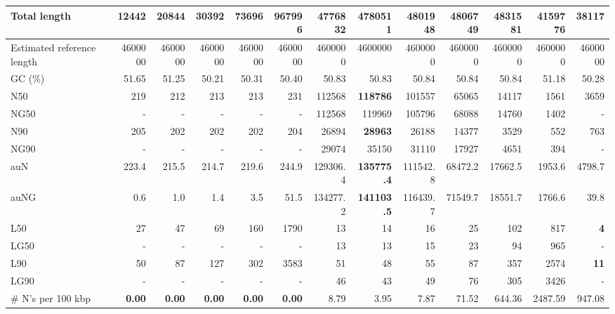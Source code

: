 \documentclass[12pt,a4paper]{article}
\begin{document}
\begin{table}[ht]
\begin{center}
\begin{tabular}{|l*{12}{|r}|}
Total length & 12442 & 20844 & 30392 & 73696 & 967996 & 4776832 & 4780511 & 4801948 & 4806749 & {\bf 4831581} & 4159776 & 38117 \\ \hline
Estimated reference length & 4600000 & 4600000 & 4600000 & 4600000 & 4600000 & 4600000 & 4600000 & 4600000 & 4600000 & 4600000 & 4600000 & 4600000 \\ \hline
GC (\%) & 51.65 & 51.25 & 50.21 & 50.31 & 50.40 & 50.83 & 50.83 & 50.84 & 50.84 & 50.84 & 51.18 & 50.28 \\ \hline
N50 & 219 & 212 & 213 & 213 & 231 & 112568 & {\bf 118786} & 101557 & 65065 & 14117 & 1561 & 3659 \\ \hline
NG50 & - & - & - & - & - & 112568 & 119969 & 105796 & 68088 & 14760 & 1402 & - \\ \hline
N90 & 205 & 202 & 202 & 202 & 204 & 26894 & {\bf 28963} & 26188 & 14377 & 3529 & 552 & 763 \\ \hline
NG90 & - & - & - & - & - & 29074 & 35150 & 31110 & 17927 & 4651 & 394 & - \\ \hline
auN & 223.4 & 215.5 & 214.7 & 219.6 & 244.9 & 129306.4 & {\bf 135775.4} & 111542.8 & 68472.2 & 17662.5 & 1953.6 & 4798.7 \\ \hline
auNG & 0.6 & 1.0 & 1.4 & 3.5 & 51.5 & 134277.2 & {\bf 141103.5} & 116439.7 & 71549.7 & 18551.7 & 1766.6 & 39.8 \\ \hline
L50 & 27 & 47 & 69 & 160 & 1790 & 13 & 14 & 16 & 25 & 102 & 817 & {\bf 4} \\ \hline
LG50 & - & - & - & - & - & 13 & 13 & 15 & 23 & 94 & 965 & - \\ \hline
L90 & 50 & 87 & 127 & 302 & 3583 & 51 & 48 & 55 & 87 & 357 & 2574 & {\bf 11} \\ \hline
LG90 & - & - & - & - & - & 46 & 43 & 49 & 76 & 305 & 3426 & - \\ \hline
\# N's per 100 kbp & {\bf 0.00} & {\bf 0.00} & {\bf 0.00} & {\bf 0.00} & {\bf 0.00} & 8.79 & 3.95 & 7.87 & 71.52 & 644.36 & 2487.59 & 947.08 \\ \hline
\end{tabular}
\end{center}
\end{table}
\end{document}
